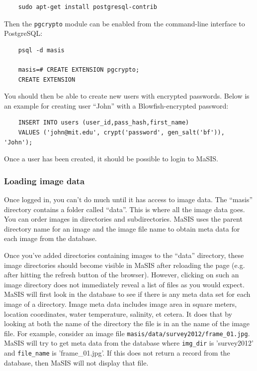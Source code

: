 \documentclass[twoside,a4paper]{refart}
\begin{document}
\begin{verbatim}
    sudo apt-get install postgresql-contrib
\end{verbatim}

Then the \texttt{pgcrypto} module can be enabled from the command-line interface to PostgreSQL:

\begin{verbatim}
    psql -d masis

    masis=# CREATE EXTENSION pgcrypto;
    CREATE EXTENSION
\end{verbatim}

You should then be able to create new users with encrypted passwords. Below is an example for creating user ``John'' with a Blowfish-encrypted password:

\begin{verbatim}
    INSERT INTO users (user_id,pass_hash,first_name)
    VALUES ('john@mit.edu', crypt('password', gen_salt('bf')), 'John');
\end{verbatim}

Once a user has been created, it should be possible to login to MaSIS.

\subsubsection{Loading image data}

Once logged in, you can't do much until it has access to image data. The ``masis'' directory contains a folder called ``data''. This is where all the image data goes. You can order images in directories and subdirectories. MaSIS uses the parent directory name for an image and the image file name to obtain meta data for each image from the database.

Once you've added directories containing images to the ``data'' directory, these image directories should become visible in MaSIS after reloading the page (e.g. after hitting the refresh button of the browser). However, clicking on such an image directory does not immediately reveal a list of files as you would expect. MaSIS will first look in the database to see if there is any meta data set for each image of a directory. Image meta data includes image area in square meters, location coordinates, water temperature, salinity, et cetera. It does that by looking at both the name of the directory the file is in an the name of the image file.
For example, consider an image file \texttt{masis/data/survey2012/frame\_01.jpg}. MaSIS will try to get meta data from the database where \texttt{img\_dir} is 'survey2012' and \texttt{file\_name} is 'frame\_01.jpg'. If this does not return a record from the database, then MaSIS will not display that file.
\end{document}
